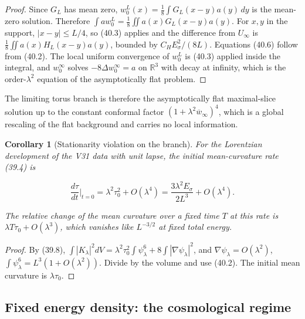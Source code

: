 \documentclass[11pt]{article}
\newtheorem{corollary}[theorem]{Corollary}
\theoremstyle{remark}
\begin{document}
\begin{proof}
Since \(G_L\) has mean zero, \(w_0^L(x)=\tfrac18\int G_L(x-y)a(y)\,dy\)
is the mean-zero solution.  Therefore
\(\int aw_0^L=\tfrac18\iint a(x)G_L(x-y)a(y)\).  For \(x,y\) in the
support, \(|x-y|\leq L/4\), so (40.3) applies and the difference from
\(U_\infty\) is \(\tfrac18\iint a(x)H_L(x-y)a(y)\), bounded by
\(C_HE_\sigma^2/(8L)\).  Equations (40.6) follow from (40.2).  The local
uniform convergence of \(w_0^L\) is (40.3) applied inside the integral,
and \(w_0^\infty\) solves \(-8\Delta w_0^\infty=a\) on \(\mathbb R^3\)
with decay at infinity, which is the order-\(\lambda^2\) equation of the
asymptotically flat problem.
\end{proof}

The limiting torus branch is therefore the asymptotically flat
maximal-slice solution up to the constant conformal factor
\((1+\lambda^2\overline w_\infty)^4\), which is a global rescaling of the
flat background and carries no local information.

\begin{corollary}[Stationarity violation on the branch]
\label{cor:v19v37-rate}
For the Lorentzian development of the V31 data with unit lapse, the
initial mean-curvature rate (39.4) is

\[
 \frac{d\tau}{dt}\Big|_{t=0}
 =\lambda^2\tau_0^2+O(\lambda^4)
 =\frac{3\lambda^2E_\sigma}{2L^3}+O(\lambda^4).                      \tag{40.7}
\]

The relative change of the mean curvature over a fixed time \(T\) at
this rate is \(\lambda T\tau_0+O(\lambda^3)\), which vanishes like
\(L^{-3/2}\) at fixed total energy.
\end{corollary}

\begin{proof}
By (39.8), \(\int|K_\lambda|^2dV=\lambda^2\tau_0^2\int\psi_\lambda^6+8\int|\nabla\psi_\lambda|^2\),
and \(\nabla\psi_\lambda=O(\lambda^2)\), \(\int\psi_\lambda^6=L^3(1+O(\lambda^2))\).
Divide by the volume and use (40.2).  The initial mean curvature is
\(\lambda\tau_0\).
\end{proof}

\subsection{Fixed energy density: the cosmological regime}
\end{document}
